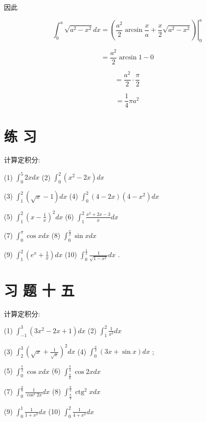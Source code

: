 \documentclass[10pt]{article}
\begin{document}
因此

\[
{\int }_{0}^{a}\sqrt{{a}^{2} - {x}^{2}}{dx} = {\left. \left( \frac{{a}^{2}}{2}\arcsin \frac{x}{a} + \frac{x}{2}\sqrt{{a}^{2} - {x}^{2}}\right) \right| }_{0}^{a}
\]

\[
= \frac{{a}^{2}}{2}\arcsin 1 - 0
\]

\[
= \frac{{a}^{2}}{2} \cdot \frac{\pi }{2}
\]

\[
= \frac{1}{4}\pi {a}^{2}
\]

\section*{练 习}

计算定积分:

(1) \({\int }_{0}^{5}{2xdx}\) (2) \({\int }_{0}^{2}\left( {{x}^{2} - {2x}}\right) {dx}\)

(3) \({\int }_{1}^{2}\left( {\sqrt{x} - 1}\right) {dx}\) (4) \({\int }_{0}^{2}\left( {4 - {2x}}\right) \left( {4 - {x}^{2}}\right) {dx}\)

(5) \({\int }_{1}^{2}{\left( x - \frac{1}{x}\right) }^{2}{dx}\) (6) \({\int }_{1}^{2}\frac{{x}^{2} + {2x} - 3}{x}{dx}\)

(7) \({\int }_{0}^{\pi }\cos {xdx}\) (8) \({\int }_{0}^{\frac{\pi }{2}}\sin {xdx}\)

(9) \({\int }_{1}^{2}\left( {{e}^{x} + \frac{1}{x}}\right) {dx}\) (10) \({\int }_{0}^{\frac{1}{2}}\frac{1}{\sqrt{1 - {x}^{2}}}{dx}\) .

\section*{习 题 十 五}

计算定积分:

(1) \({\int }_{-1}^{3}\left( {3{x}^{2} - {2x} + 1}\right) {dx}\) (2) \({\int }_{1}^{2}\frac{1}{{x}^{2}}{dx}\)

(3) \({\int }_{2}^{3}{\left( \sqrt{x} + \frac{1}{\sqrt{x}}\right) }^{2}{dx}\) (4) \({\int }_{0}^{\frac{\pi }{2}}\left( {{3x} + \sin x}\right) {dx}\) ;

(5) \({\int }_{0}^{\frac{\pi }{2}}\cos {xdx}\) (6) \({\int }_{\frac{\pi }{6}}^{\frac{\pi }{4}}\cos {2xdx}\)

(7) \({\int }_{0}^{\frac{\pi }{6}}\frac{1}{{\cos }^{2}{2x}}{dx}\) (8) \({\int }_{\frac{\pi }{4}}^{\frac{\pi }{3}}{\operatorname{ctg}}^{2}{xdx}\)

(9) \({\int }_{0}^{1}\frac{1}{1 + {x}^{2}}{dx}\) (10) \({\int }_{0}^{2}\frac{1}{4 + {x}^{2}}{dx}\)
\end{document}
